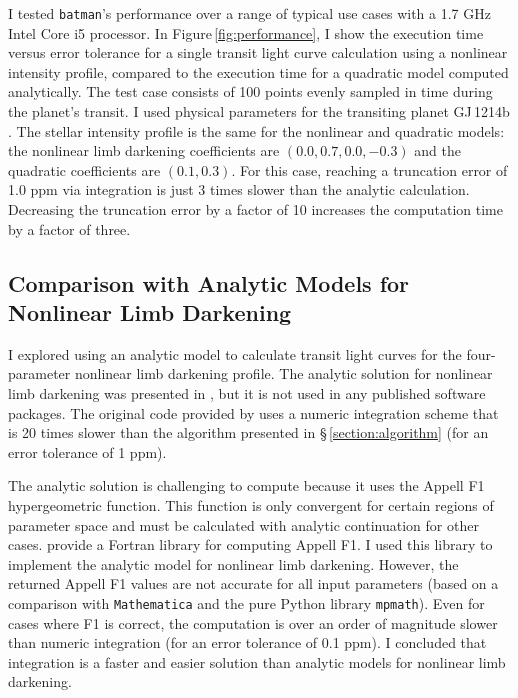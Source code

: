 \documentclass[12pt,preprint]{aastex}
\begin{document}
I tested \texttt{batman}'s performance over a range of typical use cases with a 1.7 GHz Intel Core i5 processor.  In Figure\,\ref{fig:performance}, I show the execution time versus error tolerance for a single transit light curve calculation using a nonlinear intensity profile, compared to the execution time for a quadratic model computed analytically.  The test case consists of 100 points evenly sampled in time during the planet's transit. I used physical parameters for the transiting planet GJ\,1214b \citep{kreidberg14a}. The stellar intensity profile is the same for the nonlinear and quadratic models: the nonlinear limb darkening coefficients are $(0.0, 0.7, 0.0, -0.3)$ and the quadratic coefficients are $(0.1, 0.3)$.  For this case, reaching a truncation error of 1.0 ppm via integration is just 3 times slower than the analytic calculation. Decreasing the truncation error by a factor of 10 increases the computation time by a factor of three.

\subsection{Comparison with Analytic Models for Nonlinear Limb Darkening}
I explored using an analytic model to calculate transit light curves for the four-parameter nonlinear limb darkening profile.  The analytic solution for nonlinear limb darkening was presented in \cite{mandel02}, but it is not used in any published software packages. The original code provided by \cite{mandel02} uses a numeric integration scheme that is 20 times slower than the algorithm presented in \S\,\ref{section:algorithm} (for an error tolerance of 1 ppm). 

The analytic solution is challenging to compute because it uses the Appell F1 hypergeometric function.  This function is only convergent for certain regions of parameter space and must be calculated with analytic continuation for other cases. \cite{colavecchia04} provide a Fortran library for computing Appell F1.  I used this library to implement the analytic model for nonlinear limb darkening. However, the returned Appell F1 values are not accurate for all input parameters (based on a comparison with \texttt{Mathematica} and the pure Python library \texttt{mpmath}).  Even for cases where F1 is correct, the computation is over an order of magnitude slower than numeric integration (for an error tolerance of 0.1 ppm).  I concluded that integration is a faster and easier solution than analytic models for nonlinear limb darkening.
\end{document}
